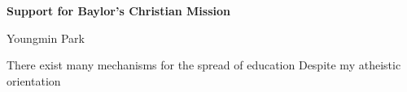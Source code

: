\documentclass[a4paper,11pt]{article}
\begin{document}
\begin{center}
\Large \textbf{Support for Baylor’s Christian Mission}

\Large Youngmin Park
\end{center}

There exist many mechanisms for the spread of education Despite my atheistic orientation
\end{document}
